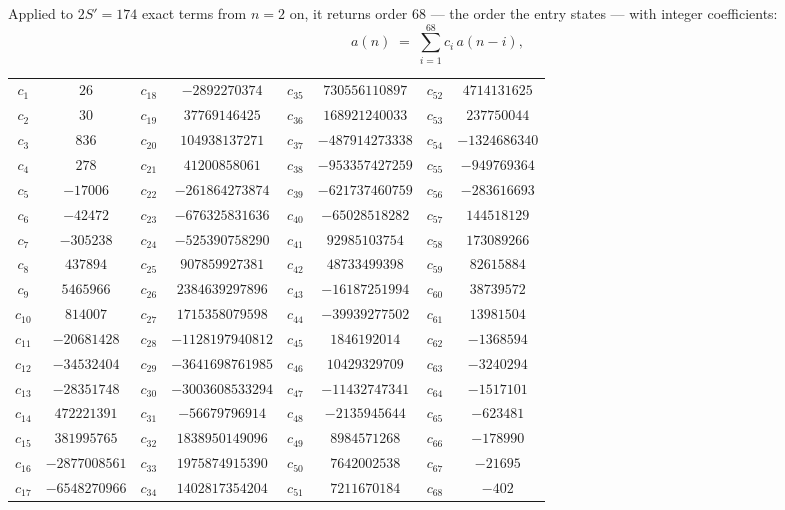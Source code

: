 \documentclass[11pt,a4paper]{article}
\theoremstyle{plain}
\theoremstyle{definition}
\begin{document}
Applied to $2S'=174$ exact terms from $n=2$ on, it returns order $68$ --- the
order the entry states --- with integer coefficients:
\[
a(n)\;=\;\sum_{i=1}^{68}c_i\,a(n-i),
\]
\begin{center}\small
\begin{tabular}{cccccccc}
$c_{1}$ & $26$ & $c_{18}$ & $-2892270374$ & $c_{35}$ & $730556110897$ & $c_{52}$ & $4714131625$ \\
$c_{2}$ & $30$ & $c_{19}$ & $37769146425$ & $c_{36}$ & $168921240033$ & $c_{53}$ & $237750044$ \\
$c_{3}$ & $836$ & $c_{20}$ & $104938137271$ & $c_{37}$ & $-487914273338$ & $c_{54}$ & $-1324686340$ \\
$c_{4}$ & $278$ & $c_{21}$ & $41200858061$ & $c_{38}$ & $-953357427259$ & $c_{55}$ & $-949769364$ \\
$c_{5}$ & $-17006$ & $c_{22}$ & $-261864273874$ & $c_{39}$ & $-621737460759$ & $c_{56}$ & $-283616693$ \\
$c_{6}$ & $-42472$ & $c_{23}$ & $-676325831636$ & $c_{40}$ & $-65028518282$ & $c_{57}$ & $144518129$ \\
$c_{7}$ & $-305238$ & $c_{24}$ & $-525390758290$ & $c_{41}$ & $92985103754$ & $c_{58}$ & $173089266$ \\
$c_{8}$ & $437894$ & $c_{25}$ & $907859927381$ & $c_{42}$ & $48733499398$ & $c_{59}$ & $82615884$ \\
$c_{9}$ & $5465966$ & $c_{26}$ & $2384639297896$ & $c_{43}$ & $-16187251994$ & $c_{60}$ & $38739572$ \\
$c_{10}$ & $814007$ & $c_{27}$ & $1715358079598$ & $c_{44}$ & $-39939277502$ & $c_{61}$ & $13981504$ \\
$c_{11}$ & $-20681428$ & $c_{28}$ & $-1128197940812$ & $c_{45}$ & $1846192014$ & $c_{62}$ & $-1368594$ \\
$c_{12}$ & $-34532404$ & $c_{29}$ & $-3641698761985$ & $c_{46}$ & $10429329709$ & $c_{63}$ & $-3240294$ \\
$c_{13}$ & $-28351748$ & $c_{30}$ & $-3003608533294$ & $c_{47}$ & $-11432747341$ & $c_{64}$ & $-1517101$ \\
$c_{14}$ & $472221391$ & $c_{31}$ & $-56679796914$ & $c_{48}$ & $-2135945644$ & $c_{65}$ & $-623481$ \\
$c_{15}$ & $381995765$ & $c_{32}$ & $1838950149096$ & $c_{49}$ & $8984571268$ & $c_{66}$ & $-178990$ \\
$c_{16}$ & $-2877008561$ & $c_{33}$ & $1975874915390$ & $c_{50}$ & $7642002538$ & $c_{67}$ & $-21695$ \\
$c_{17}$ & $-6548270966$ & $c_{34}$ & $1402817354204$ & $c_{51}$ & $7211670184$ & $c_{68}$ & $-402$ \\
\end{tabular}
\end{center}
\end{document}
